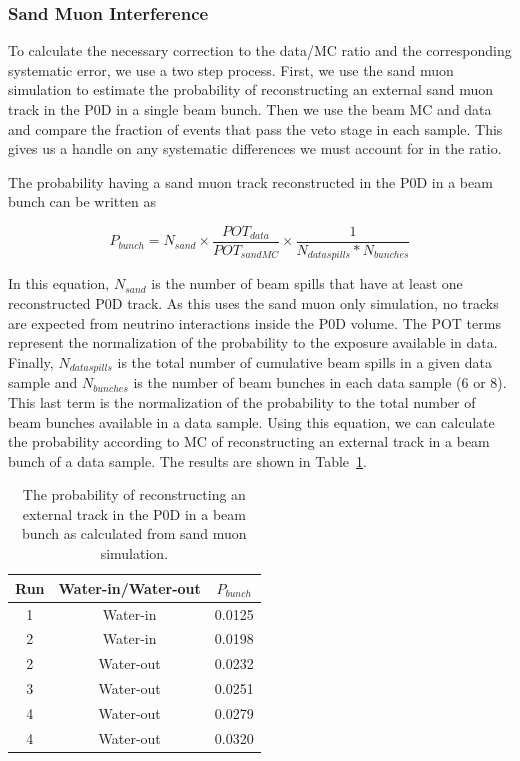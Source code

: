 \subsubsection{Sand Muon Interference}

To calculate the necessary correction to the data/MC ratio and the corresponding systematic error, we use a two step process. First, we use the sand muon simulation to estimate the probability of reconstructing an external sand muon track in the P0D in a single beam bunch. Then we use the beam MC and data and compare the fraction of events that pass the veto stage in each sample. This gives us a handle on any systematic differences we must account for in the ratio.

The probability having a sand muon track reconstructed in the P0D in a beam bunch can be written as

\begin{equation}
P_{bunch} = N_{sand} \times \frac{POT_{data}}{POT_{sand MC}} \times \frac{1}{N_{data spills}*N_{bunches}}
\end{equation}

In this equation, $N_{sand}$ is the number of beam spills that have at least one reconstructed P0D track. As this uses the sand muon only simulation, no tracks are expected from neutrino interactions inside the P0D volume. The POT terms represent the normalization of the probability to the exposure available in data. Finally, $N_{data spills}$ is the total number of cumulative beam spills in a given data sample and $N_{bunches}$ is the number of beam bunches in each data sample (6 or 8). This last term is the normalization of the probability to the total number of beam bunches available in a data sample. Using this equation, we can calculate the probability according to MC of reconstructing an external track in a beam bunch of a data sample. The results are shown in Table~\ref{tab:pbunch}.

\begin{table}[h]
\caption{The probability of reconstructing an external track in the P0D in a beam bunch as calculated from sand muon simulation.}
\label{tab:pbunch}
\centering
\begin{tabular}{ccc}\toprule
Run & Water-in/Water-out & $P_{bunch}$ \\
\midrule
1 & Water-in & 0.0125 \\
2 & Water-in & 0.0198 \\
2 & Water-out & 0.0232 \\
3 & Water-out & 0.0251 \\
4 & Water-out & 0.0279 \\
4 & Water-out & 0.0320 \\
\bottomrule
\end{tabular}
\end{table}

